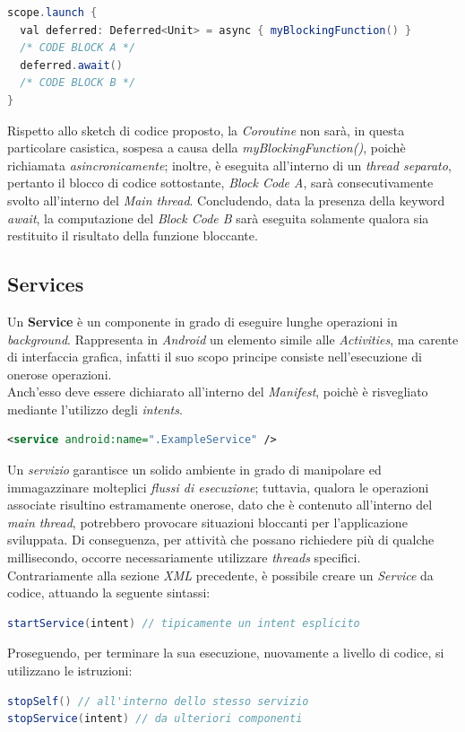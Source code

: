 \documentclass{article}
\begin{document}
\begin{lstlisting}[language=JAVA]
scope.launch {
  val deferred: Deferred<Unit> = async { myBlockingFunction() }
  /* CODE BLOCK A */
  deferred.await()
  /* CODE BLOCK B */
}
\end{lstlisting}
Rispetto allo sketch di codice proposto, la \textit{Coroutine} non sarà, in questa particolare casistica, sospesa a causa della \textit{myBlockingFunction()}, poichè richiamata \textit{asincronicamente}; inoltre, è eseguita all'interno di un \textit{thread separato}, pertanto il blocco di codice sottostante, \textit{Block Code A}, sarà consecutivamente svolto all'interno del \textit{Main thread}. Concludendo, data la presenza della keyword \textit{await}, la computazione del \textit{Block Code B} sarà eseguita solamente qualora sia restituito il risultato della funzione bloccante.

\subsection*{Services}
Un \textbf{Service} è un componente in grado di eseguire lunghe operazioni in \textit{background}. Rappresenta in \textit{Android} un elemento simile alle \textit{Activities}, ma carente di interfaccia grafica, infatti il suo scopo principe consiste nell'esecuzione di onerose operazioni.\vspace*{7pt}\\
Anch'esso deve essere dichiarato all'interno del \textit{Manifest}, poichè è risvegliato mediante l'utilizzo degli \textit{intents}.
\begin{lstlisting}[language=XML]
<service android:name=".ExampleService" />
\end{lstlisting}
Un \textit{servizio} garantisce un solido ambiente in grado di manipolare ed immagazzinare molteplici \textit{flussi di esecuzione}; tuttavia, qualora le operazioni associate risultino estramamente onerose, dato che è contenuto all'interno del \textit{main thread}, potrebbero provocare situazioni bloccanti per l'applicazione sviluppata. Di conseguenza, per attività che possano richiedere più di qualche millisecondo, occorre necessariamente utilizzare \textit{threads} specifici.\vspace*{7pt}\\
Contrariamente alla sezione \textit{XML} precedente, è possibile creare un \textit{Service} da codice, attuando la seguente sintassi:
\begin{lstlisting}[language=JAVA]
startService(intent) // tipicamente un intent esplicito
\end{lstlisting}  
Proseguendo, per terminare la sua esecuzione, nuovamente a livello di codice, si utilizzano le istruzioni:
\begin{lstlisting}[language=JAVA]
stopSelf() // all'interno dello stesso servizio
stopService(intent) // da ulteriori componenti
\end{lstlisting}  
\end{document}
